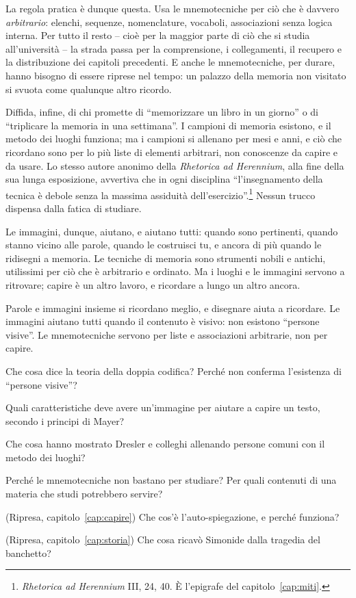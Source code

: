 La regola pratica è dunque questa. Usa le mnemotecniche per ciò che è
davvero \emph{arbitrario}: elenchi, sequenze, nomenclature, vocaboli,
associazioni senza logica interna. Per tutto il resto -- cioè per la
maggior parte di ciò che si studia all'università -- la strada passa per
la comprensione, i collegamenti, il recupero e la distribuzione dei
capitoli precedenti. E anche le mnemotecniche, per durare, hanno bisogno
di essere riprese nel tempo: un palazzo della memoria non visitato si
svuota come qualunque altro ricordo.

Diffida, infine, di chi promette di \enquote{memorizzare un libro in un
giorno} o di \enquote{triplicare la memoria in una settimana}. I
campioni di memoria esistono, e il metodo dei luoghi funziona; ma i
campioni si allenano per mesi e anni, e ciò che ricordano sono per lo
più liste di elementi arbitrari, non conoscenze da capire e da usare.
Lo stesso autore anonimo della \emph{Rhetorica ad Herennium}, alla fine
della sua lunga esposizione, avvertiva che in ogni disciplina
\enquote{l'insegnamento della tecnica è debole senza la massima
assiduità dell'esercizio}.\footnote{\emph{Rhetorica ad Herennium} III,
24, 40. È l'epigrafe del capitolo~\ref{cap:miti}.} Nessun trucco
dispensa dalla fatica di studiare.

\asterismo

Le immagini, dunque, aiutano, e aiutano tutti: quando sono pertinenti,
quando stanno vicino alle parole, quando le costruisci tu, e ancora di
più quando le ridisegni a memoria. Le tecniche di memoria sono
strumenti nobili e antichi, utilissimi per ciò che è arbitrario e
ordinato. Ma i luoghi e le immagini servono a ritrovare; capire è un
altro lavoro, e ricordare a lungo un altro ancora.

\begin{daricordare}
Parole e immagini insieme si ricordano meglio, e disegnare aiuta a
ricordare. Le immagini aiutano tutti quando il contenuto è visivo: non
esistono \enquote{persone visive}. Le mnemotecniche servono per liste e
associazioni arbitrarie, non per capire.
\end{daricordare}

\begin{domande}
  \item Che cosa dice la teoria della doppia codifica? Perché non
        conferma l'esistenza di \enquote{persone visive}?
  \item Quali caratteristiche deve avere un'immagine per aiutare a
        capire un testo, secondo i principi di Mayer?
  \item Che cosa hanno mostrato Dresler e colleghi allenando persone
        comuni con il metodo dei luoghi?
  \item Perché le mnemotecniche non bastano per studiare? Per quali
        contenuti di una materia che studi potrebbero servire?
  \item (Ripresa, capitolo~\ref{cap:capire}) Che cos'è
        l'auto-spiegazione, e perché funziona?
  \item (Ripresa, capitolo~\ref{cap:storia}) Che cosa ricavò Simonide
        dalla tragedia del banchetto?
\end{domande}

